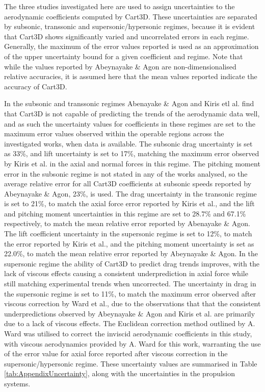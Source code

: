 The three studies investigated here are used to assign uncertainties to the aerodynamic coefficients computed by Cart3D. These uncertainties are separated by subsonic, transsonic and supersonic/hypersonic regimes, because it is evident that Cart3D shows significantly varied and uncorrelated errors in each regime. Generally, the maximum of the error values reported is used as an approximation of the upper uncertainty bound for a given coefficient and regime. 
  Note that while the values reported by Abeynayake \& Agon\cite{Abeynayake2013a} are non-dimensionalised relative accuracies, it is assumed here that the mean values reported indicate the accuracy of Cart3D. 
  
  In the subsonic and transsonic regimes Abenayake \& Agon and Kiris etl al. find that Cart3D is not capable of predicting the trends of the aerodynamic data well\cite{Abeynayake2013a,Kiris2011}, and as such the uncertainty values for coefficients in these regimes are set to the maximum error values observed within the operable regions across the investigated works, when data is available.
  The subsonic drag uncertainty is set as 33\%, and lift uncertainty is set to 17\%, matching the  maximum error observed by Kiris et al.\cite{Kiris2011} in the axial and normal forces in this regime. 
The pitching moment error in the subsonic regime is not stated in any of the works analysed, so the average relative error for all Cart3D coefficients at subsonic speeds reported by Abeynayake \& Agon\cite{Abeynayake2013a}, 23\%, is used.
The drag uncertainty in the transonic regime is set to 21\%, to match the axial force error reported by Kiris et al.\cite{Kiris2011}, and the lift and pitching moment uncertainties in this regime are set to 28.7\% and 67.1\% respectively, to match the mean relative error reported by Abenayake \& Agon\cite{Abeynayake2013a}. 
The lift coefficient uncertainty in the supersonic regime is set to 12\%, to match the error reported by Kiris et al.\cite{Kiris2011}, and the pitching moment uncertainty is set as 22.0\%, to match the mean relative error reported by Abeynayake \& Agon\cite{Abeynayake2013a}. 
In the supersonic regime the ability of Cart3D to predict drag trends improves, with the lack of viscous effects causing a consistent underprediction in axial force while still matching experimental trends when uncorrected\cite{Abeynayake2013a,Ward2018,Kiris2011}. The uncertainty in drag in the supersonic regime is set to 11\%, to match the maximum error observed after viscous correction by Ward et al.\cite{Ward2018}, due to the observations that that the consistent underpredictions observed by Abeynayake \& Agon\cite{Abeynayake2013a} and Kiris et al.\cite{Kiris2011} are primarily due to a lack of viscous effects. The Euclidean correction method outlined by A. Ward was utilised to correct the inviscid aerodynamic coefficients in this study, with viscous aerodynamics provided by A. Ward for this work, warranting the use of the error value for axial force reported after viscous correction in the supersonic/hypersonic regime. 
These uncertainty values are summarised in Table \ref{tab:AppendixUncertainty}, along with the uncertainties in the propulsion systems. 




